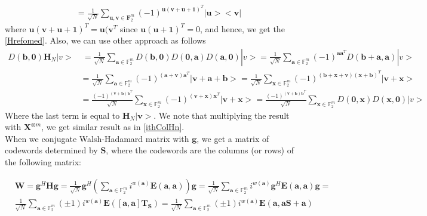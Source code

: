 \documentclass{article}
\begin{document}
{\begin{align*}
		& =  \frac{1}{\sqrt{N}} \sum_{\mathbf{u}, \mathbf{v} \in \mathbf{F}_2^m}{\left(-1\right)^{\mathbf{u} (\mathbf{v+u+1})^T } |\mathbf{u}><\mathbf{v}|}
	\end{align*}
where $\mathbf{u}(\mathbf{v+u+1})^T=\mathbf{u}(\mathbf{v}^T$ since $\mathbf{u}(\mathbf{u+1})^T=0$, and hence, we get the \eqref{Hrefomed}.
		Also, we can use other approach as follows
		\begin{align*}
			D\left(\mathbf{b},\mathbf{0}\right) \mathbf{H}_N |v>& \: = \frac{1}{\sqrt{N}}\sum_{\mathbf{a} \in \mathbb{F}_2^m}{D\left(\mathbf{b},\mathbf{0}\right) D\left(\mathbf{0},\mathbf{a}\right) D\left(\mathbf{a},\mathbf{0}\right)}|v> = \frac{1}{\sqrt{N}}\sum_{\mathbf{a} \in \mathbb{F}_2^m}{(-1)^{\mathbf{a}\mathbf{a}^T} D\left(\mathbf{b}+\mathbf{a},\mathbf{a}\right)}|v> \\
			& = \frac{1}{\sqrt{N}}\sum_{\mathbf{a} \in \mathbb{F}_2^m}{(-1)^{(\mathbf{a+v})\mathbf{a}^T} | \mathbf{v}+\mathbf{a}+\mathbf{b}>}=\frac{1}{\sqrt{N}}\sum_{\mathbf{x} \in \mathbb{F}_2^m}{(-1)^{(\mathbf{b+x+v})(\mathbf{x+b})^T} | \mathbf{v}+\mathbf{x}>} \\
			&=\frac{(-1)^{(\mathbf{v+b})
					\mathbf{b}^T }}{\sqrt{N}}\sum_{\mathbf{x} \in \mathbb{F}_2^m}{(-1)^{(\mathbf{v+x})\mathbf{x}^T} | \mathbf{v}+\mathbf{x}>}=\frac{(-1)^{(\mathbf{v+b})
					\mathbf{b}^T }}{\sqrt{N}}\sum_{\mathbf{x} \in \mathbb{F}_2^m}{D(\mathbf{0, x}) D(\mathbf{x, 0})}|v>
		\end{align*}
		Where the last term is equal to $\mathbf{H}_N | \mathbf{v}>$. We note that multiplying the result with $\mathbf{X}^{\otimes m}$, we get similar result as in \eqref{ithColHn}.
	}
	\\
	
	When we conjugate Walsh-Hadamard matrix with $\mathbf{g}$, we get a matrix of codewords determined by $\mathbf{S}$, where the codewords are the columns (or rows) of the following matrix:
	
	\begin{align*}
		&\mathbf{W} = \mathbf{g}^H\mathbf{H}\mathbf{g} = \frac{1}{\sqrt{N}}\mathbf{g}^H\left(\sum_{\mathbf{a} \in \mathbb{F}^m_2} i^{w(\mathbf{a})}\mathbf{E}(\mathbf{a},\mathbf{a})\right)\mathbf{g} = \frac{1}{\sqrt{N}}\sum_{\mathbf{a} \in \mathbb{F}^m_2} i^{w(\mathbf{a})}\mathbf{g}^H\mathbf{E}(\mathbf{a},\mathbf{a})\mathbf{g} = \\ &\frac{1}{\sqrt{N}}\sum_{\mathbf{a} \in \mathbb{F}^m_2}(\pm 1) i^{w(\mathbf{a})}\mathbf{E}(\left[\mathbf{a},\mathbf{a}\right]\mathbf{T}_\mathbf{S}) = \frac{1}{\sqrt{N}}\sum_{\mathbf{a} \in \mathbb{F}^m_2}(\pm 1) i^{w(\mathbf{a})}\mathbf{E}(\mathbf{a},\mathbf{a}\mathbf{S} + \mathbf{a})
	\end{align*}
	
\end{document}
